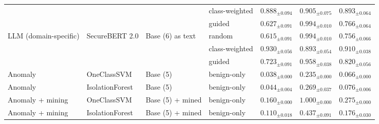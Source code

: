 \begin{table}[htbp]
{\begin{tabular}{llllccc}
 &  &  & class-weighted & $0.888_{\pm 0.094}$ & $0.905_{\pm 0.075}$ & $0.893_{\pm 0.064}$ \\
 &  &  & guided & $0.627_{\pm 0.091}$ & $0.994_{\pm 0.010}$ & $0.766_{\pm 0.064}$ \\
\addlinespace
LLM (domain-specific) & SecureBERT 2.0 & Base (6) as text & random & $0.615_{\pm 0.091}$ & $0.994_{\pm 0.010}$ & $0.756_{\pm 0.066}$ \\
 &  &  & class-weighted & $0.930_{\pm 0.056}$ & $0.893_{\pm 0.054}$ & $0.910_{\pm 0.038}$ \\
 &  &  & guided & $0.723_{\pm 0.091}$ & $0.958_{\pm 0.038}$ & $0.820_{\pm 0.056}$ \\
\midrule
Anomaly & OneClassSVM & Base (5) & benign-only & $0.038_{\pm 0.000}$ & $0.235_{\pm 0.000}$ & $0.066_{\pm 0.000}$ \\
\addlinespace
Anomaly & IsolationForest & Base (5) & benign-only & $0.044_{\pm 0.004}$ & $0.269_{\pm 0.037}$ & $0.076_{\pm 0.006}$ \\
\addlinespace
Anomaly + mining & OneClassSVM & Base (5) + mined & benign-only & $0.160_{\pm 0.000}$ & $1.000_{\pm 0.000}$ & $0.275_{\pm 0.000}$ \\
\addlinespace
Anomaly + mining & IsolationForest & Base (5) + mined & benign-only & $0.110_{\pm 0.018}$ & $0.437_{\pm 0.091}$ & $0.176_{\pm 0.030}$ \\
\bottomrule
\end{tabular}%
}
\end{table}
